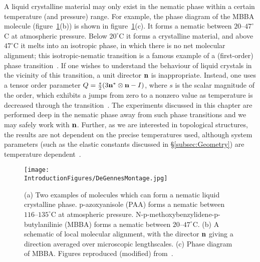 A liquid crystalline material may only exist in the nematic phase within a certain temperature (and pressure) range. For example, the phase diagram of the MBBA molecule (figure~\ref{fig:DeGennesMontage}(b)) is shown in figure~\ref{fig:DeGennesMontage}(c). It forms a nematic between $20$--$47^\circ$C at atmospheric pressure. Below $20^\circ$C it forms a crystalline material, and above $47^\circ$C it melts into an isotropic phase, in which there is no net molecular alignment; this isotropic-nematic transition is a famous example of a (first-order) phase transition~\citep{deGennes1992}. If one wishes to understand the behaviour of liquid crystals in the vicinity of this transition, a unit director $\bf n$ is inappropriate. Instead, one uses a tensor order parameter $Q = \frac{s}{2}(3{\bf n}^* \otimes {\bf n} - I)$, where $s$ is the scalar magnitude of the order, which exhibits a jumps from zero to a nonzero value as temperature is decreased through the transition~\citep{deGennes1992,Mottram}. The experiments discussed in this chapter are performed deep in the nematic phase away from such phase transitions and we may safely work with $\bf n$. Further, as we are interested in topological structures, the results are not dependent on the precise temperatures used, although system parameters (such as the elastic constants discussed in \S\ref{subsec:Geometry}) are temperature dependent~\citep{deGennes1992}.
\begin{figure}[htbp]
\centering
\texttt{[image: \\IntroductionFigures/DeGennesMontage.jpg]}
    \caption[Examples of nematic phase forming molecules.]{(a) Two examples of molecules which can form a nematic liquid crystalline phase. p-azoxyanisole (PAA) forms a nematic between $116$--$135^\circ$C at atmospheric pressure. N-p-methoxybenzylidene-p-butylanilinie (MBBA) forms a nematic between $20$--$47^\circ$C. (b) A schematic of local molecular alignment, with the director $\bf n$ giving a direction averaged over microscopic lengthscales. (c) Phase diagram of MBBA. Figures reproduced (modified) from~\citep{deGennes1992,Keyes1975}.}
\label{fig:DeGennesMontage}
\end{figure}

